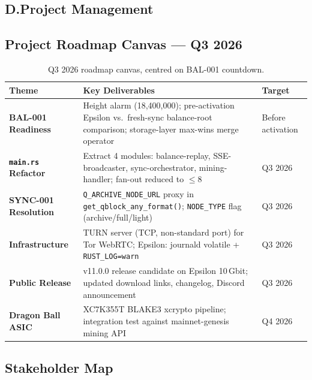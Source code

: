 \documentclass[12pt,a4paper]{article}
\begin{document}
\subsection*{D.\enspace Project Management}

\subsection{Project Roadmap Canvas --- Q3 2026}

\begin{table}[H]
\centering
\small
\renewcommand{\arraystretch}{1.3}
\begin{tabularx}{\linewidth}{lXl}
\toprule
\textbf{Theme} & \textbf{Key Deliverables} & \textbf{Target} \\
\midrule
\textbf{BAL-001 Readiness} &
  Height alarm (18,400,000); pre-activation Epsilon vs.\ fresh-sync
  balance-root comparison; storage-layer max-wins merge operator &
  Before activation \\
\rowcolor{rowgray}
\textbf{\texttt{main.rs} Refactor} &
  Extract 4 modules: balance-replay, SSE-broadcaster,
  sync-orchestrator, mining-handler; fan-out reduced to $\leq$8 &
  Q3 2026 \\
\textbf{SYNC-001 Resolution} &
  \texttt{Q\_ARCHIVE\_NODE\_URL} proxy in \texttt{get\_qblock\_any\_format()};
  \texttt{NODE\_TYPE} flag (archive/full/light) &
  Q3 2026 \\
\rowcolor{rowgray}
\textbf{Infrastructure} &
  TURN server (TCP, non-standard port) for Tor WebRTC;
  Epsilon: journald volatile + \texttt{RUST\_LOG=warn} &
  Q3 2026 \\
\textbf{Public Release} &
  v11.0.0 release candidate on Epsilon 10\,Gbit;
  updated download links, changelog, Discord announcement &
  Q3 2026 \\
\rowcolor{rowgray}
\textbf{Dragon Ball ASIC} &
  XC7K355T BLAKE3 xcrypto pipeline;
  integration test against mainnet-genesis mining API &
  Q4 2026 \\
\bottomrule
\end{tabularx}
\caption{Q3 2026 roadmap canvas, centred on BAL-001 countdown.}
\end{table}

\subsection{Stakeholder Map}
\end{document}

